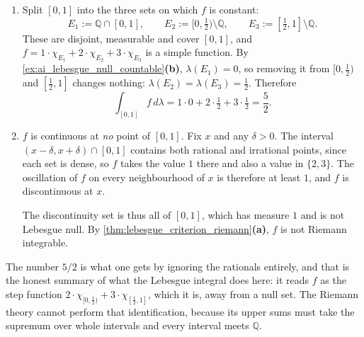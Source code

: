 \begin{exercisesolution}
\label{sol:ai_lebesgue_three_valued}
\begin{enumerate}[label=\textbf{(\alph*)}]
  \item Split $[0,1]$ into the three sets on which $f$ is constant:
    \[E_1 := \mathbb{Q}\cap[0,1], \qquad
      E_2 := [0,\tfrac12)\setminus\mathbb{Q}, \qquad
      E_3 := [\tfrac12,1]\setminus\mathbb{Q}.\]
    These are disjoint, measurable and cover $[0,1]$, and $f = 1\cdot\chi_{E_1} + 2\cdot\chi_{E_2}
    + 3\cdot\chi_{E_3}$ is a simple function. By
    \cref{ex:ai_lebesgue_null_countable}\textbf{(b)}, $\lambda(E_1) = 0$, so removing it from
    $[0,\tfrac12)$ and $[\tfrac12,1]$ changes nothing: $\lambda(E_2) = \lambda(E_3) = \tfrac12$.
    Therefore
    \[\int_{[0,1]} f\,d\lambda = 1\cdot 0 + 2\cdot\tfrac12 + 3\cdot\tfrac12 = \frac52.\]

  \item $f$ is continuous at \emph{no} point of $[0,1]$. Fix $x$ and any $\delta > 0$. The interval
    $(x-\delta,x+\delta)\cap[0,1]$ contains both rational and irrational points, since each set is
    dense, so $f$ takes the value $1$ there and also a value in $\{2,3\}$. The oscillation of $f$
    on every neighbourhood of $x$ is therefore at least $1$, and $f$ is discontinuous at $x$.

    The discontinuity set is thus all of $[0,1]$, which has measure $1$ and is not Lebesgue null.
    By \cref{thm:lebesgue_criterion_riemann}\textbf{(a)}, $f$ is not Riemann integrable.
\end{enumerate}
\begin{remark}
The number $5/2$ is what one gets by ignoring the rationals entirely, and that is the honest
summary of what the Lebesgue integral does here: it reads $f$ as the step function
$2\cdot\chi_{[0,\frac12)} + 3\cdot\chi_{[\frac12,1]}$, which it is, away from a null set. The
Riemann theory cannot perform that identification, because its upper sums must take the supremum
over whole intervals and every interval meets $\mathbb{Q}$.
\end{remark}
\end{exercisesolution}

